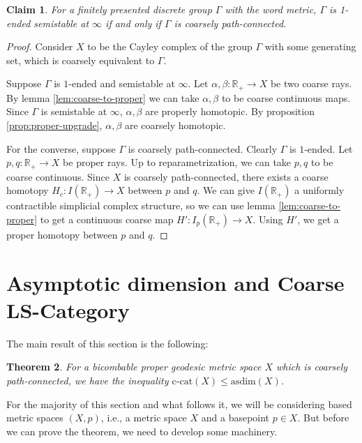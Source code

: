 \documentclass {amsart}
\newcommand {\ccat}     {\text{c-cat}}
\newcommand {\asdim}    {\text{asdim}}
\newcommand {\Rplus}    {\mathbb{R}_{+}}
\newtheorem   {theorem}               {Theorem}       [section]
\newtheorem   {claim}       [theorem] {Claim}
\theoremstyle {definition}
\begin{document}
\begin{claim} \label{clm:groups-semistable-pi0}
For a finitely presented discrete group \( \Gamma \) with the word metric, \( \Gamma \)
is 1-ended semistable at \( \infty \) if and only if \( \Gamma \) is coarsely
path-connected.
\end{claim}

\begin{proof}
    Consider \( X \) to be the Cayley complex of the group \( \Gamma \) with
    some generating set, which is coarsely equivalent to \( \Gamma \).

    Suppose \( \Gamma \) is \( 1 \)-ended and semistable at \( \infty \). Let \(
    \alpha, \beta : \Rplus \to X \) be two coarse rays. By lemma
    \ref{lem:coarse-to-proper} we can take \( \alpha, \beta \) to be coarse
    continuous maps. Since \( \Gamma \) is semistable at \( \infty \), \( \alpha,
    \beta \) are properly homotopic. By proposition \ref{prop:proper-upgrade},
    \( \alpha, \beta \) are coarsely homotopic.

    For the converse, suppose \( \Gamma \) is coarsely path-connected. Clearly \(
    \Gamma \) is \( 1 \)-ended. Let \( p,q : \Rplus \to X \) be proper rays. Up to
    reparametrization, we can take \( p,q \) to be coarse continuous. Since \( X
    \) is coarsely path-connected, there exists a coarse homotopy \( H_c :
    I(\Rplus) \to X \) between \( p \) and \( q \). We can give \( I(\Rplus) \) a
    uniformly contractible simplicial complex structure, so we can use lemma
    \ref{lem:coarse-to-proper} to get a continuous coarse map \( H' : I_p(\Rplus)
    \to X \). Using \( H' \), we get a proper homotopy between \( p \) and \( q
    \).
\end{proof}

\section {Asymptotic dimension and Coarse LS-Category}

The main result of this section is the following:
\begin{theorem}
    For a bicombable proper geodesic metric space \( X \) which is coarsely
    path-connected, we have the inequality \(
    \ccat(X) \leq \asdim (X) \).
\end{theorem}

For the majority of this section and what follows it, we will be considering
based metric spaces \( (X, p) \), i.e., a metric space \( X \) and a basepoint
\( p \in X \). But before we can prove the theorem, we need to develop some
machinery.
\end{document}
